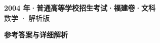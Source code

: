 \documentclass[zihao=-4, a4paper]{ctexart}
\begin{document}
\begin{center}
  {\Large\bfseries 2004 年·普通高等学校招生考试·福建卷·文科}\\[4pt]
  {\large 数学 · 解析版}
\end{center}
\medskip
{}

\clearpage
{}
\begin{center}{\Large\bfseries 参考答案与详细解析}\end{center}
\medskip

\end{document}
